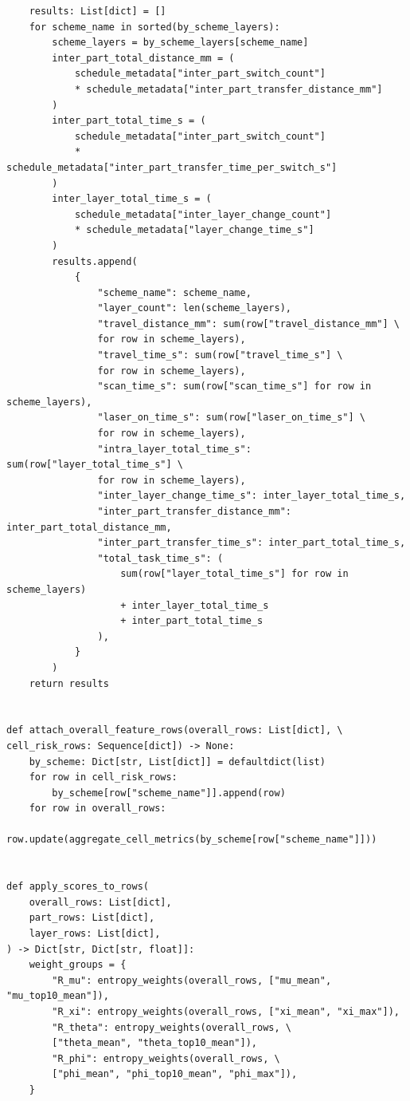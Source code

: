 \documentclass[a4paper, 12pt]{ctexart}
\begin{document}
\begin{verbatim}
    results: List[dict] = []
    for scheme_name in sorted(by_scheme_layers):
        scheme_layers = by_scheme_layers[scheme_name]
        inter_part_total_distance_mm = (
            schedule_metadata["inter_part_switch_count"]
            * schedule_metadata["inter_part_transfer_distance_mm"]
        )
        inter_part_total_time_s = (
            schedule_metadata["inter_part_switch_count"]
            * schedule_metadata["inter_part_transfer_time_per_switch_s"]
        )
        inter_layer_total_time_s = (
            schedule_metadata["inter_layer_change_count"]
            * schedule_metadata["layer_change_time_s"]
        )
        results.append(
            {
                "scheme_name": scheme_name,
                "layer_count": len(scheme_layers),
                "travel_distance_mm": sum(row["travel_distance_mm"] \
                for row in scheme_layers),
                "travel_time_s": sum(row["travel_time_s"] \
                for row in scheme_layers),
                "scan_time_s": sum(row["scan_time_s"] for row in scheme_layers),
                "laser_on_time_s": sum(row["laser_on_time_s"] \
                for row in scheme_layers),
                "intra_layer_total_time_s": sum(row["layer_total_time_s"] \
                for row in scheme_layers),
                "inter_layer_change_time_s": inter_layer_total_time_s,
                "inter_part_transfer_distance_mm": inter_part_total_distance_mm,
                "inter_part_transfer_time_s": inter_part_total_time_s,
                "total_task_time_s": (
                    sum(row["layer_total_time_s"] for row in scheme_layers)
                    + inter_layer_total_time_s
                    + inter_part_total_time_s
                ),
            }
        )
    return results


def attach_overall_feature_rows(overall_rows: List[dict], \
cell_risk_rows: Sequence[dict]) -> None:
    by_scheme: Dict[str, List[dict]] = defaultdict(list)
    for row in cell_risk_rows:
        by_scheme[row["scheme_name"]].append(row)
    for row in overall_rows:
        row.update(aggregate_cell_metrics(by_scheme[row["scheme_name"]]))


def apply_scores_to_rows(
    overall_rows: List[dict],
    part_rows: List[dict],
    layer_rows: List[dict],
) -> Dict[str, Dict[str, float]]:
    weight_groups = {
        "R_mu": entropy_weights(overall_rows, ["mu_mean", "mu_top10_mean"]),
        "R_xi": entropy_weights(overall_rows, ["xi_mean", "xi_max"]),
        "R_theta": entropy_weights(overall_rows, \
        ["theta_mean", "theta_top10_mean"]),
        "R_phi": entropy_weights(overall_rows, \
        ["phi_mean", "phi_top10_mean", "phi_max"]),
    }


\end{verbatim}
\end{document}
